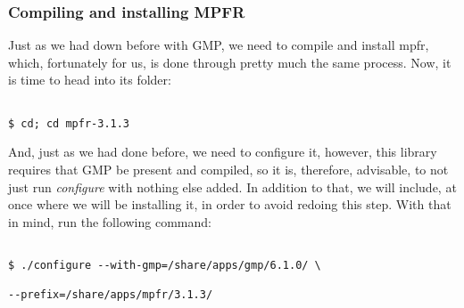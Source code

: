 \documentclass[]{article}
\begin{document}
                                                                                                                                                \subsubsection{Compiling and installing MPFR}
                                                                                                                                                Just as we had down before with GMP, we need to compile and install mpfr, which, fortunately for us, is done through pretty much the
                                                                                                                                                same process. Now, it is time to head into its folder:
                                                                                                                                                \begin{lstlisting}
                                                                                                                                                $ cd; cd mpfr-3.1.3
                                                                                                                                                \end{lstlisting}
                                                                                                                                                And, just as we had done before, we need to configure it, however, this library requires that GMP be present and compiled, so it is,
                                                                                                                                                therefore, advisable, to not just run \textit{configure} with nothing else added. In addition to that, we will include, at once where
                                                                                                                                                we will be installing it, in order to avoid redoing this step. With that in mind, run the following command:
                                                                                                                                                \begin{lstlisting}
                                                                                                                                                $ ./configure --with-gmp=/share/apps/gmp/6.1.0/ \ 
                                                                                                                                                --prefix=/share/apps/mpfr/3.1.3/
                                                                                                                                                \end{lstlisting}
\end{document}
